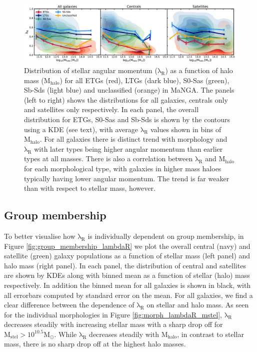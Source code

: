 \begin{figure}
    \centering\includegraphics[width=\linewidth]{thesis/latex/cw_spin/morphology_lambdaR_mhalo_kde_wo_unclassified.pdf}
    \caption{Distribution of stellar angular momentum ($\mathrm{\lambda_R}$) as a function of halo mass ($\mathrm{M_{halo}}$) for all ETGs (red), LTGs (dark blue), S0-Sas (green), Sb-Sds (light blue) and unclassified (orange) in MaNGA. The panels (left to right) shows the distributions for all galaxies, centrals only and satellites only respectively. In each panel, the overall distribution for ETGs, S0-Sas and Sb-Sds is shown by the contours using a KDE (see text), with average $\mathrm{\lambda_R}$ values shown in bins of $\mathrm{M_{halo}}$. For all galaxies there is distinct trend with morphology and $\mathrm{\lambda_R}$  with later types being higher angular momentum than earlier types at all masses. There is also a correlation between $\mathrm{\lambda_R}$ and $\mathrm{M_{halo}}$ for each morphological type, with galaxies in higher mass haloes typically having lower angular momentum. The trend is far weaker than with respect to stellar mass, however.}
\label{fig:morph_lambdaR_mhalo}
\end{figure} 

\subsection{Group membership}
To better visualise how $\mathrm{\lambda_R}$ is individually dependent on group membership, in Figure \ref{fig:group_membership_lambdaR} we plot the overall central (navy) and satellite (green) galaxy populations as a function of stellar mass (left panel) and halo mass (right panel). In each panel, the distribution of central and satellites are shown by KDEs along with binned mean as a function of stellar (halo) mass respectively. In addition the binned mean for all galaxies is shown in black, with all errorbars computed by standard error on the mean. For all galaxies, we find a clear difference between the dependence of $\mathrm{\lambda_R}$ on stellar and halo mass. As seen for the individual morphologies in Figure \ref{fig:morph_lambdaR_mstel}, $\mathrm{\lambda_R}$ decreases steadily with increasing stellar mass with a sharp drop off for $\mathrm{M_{stel} > 10^{10.5}M_{\odot}}$. While $\mathrm{\lambda_R}$ decreases steadily with $\mathrm{M_{halo}}$, in contrast to stellar mass, there is no sharp drop off at the highest halo masses. 

